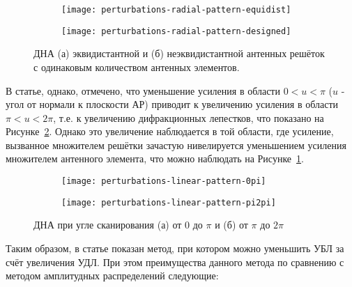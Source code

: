 \begin{figure}[H]
    \centering
    \begin{subfigure}[b]{0.4\textwidth}
        \centering
        \texttt{[image: perturbations-radial-pattern-equidist]}
        \caption{}%
    \end{subfigure}
    \begin{subfigure}[b]{0.4\textwidth}
        \centering
        \texttt{[image: perturbations-radial-pattern-designed]}
        \caption{}%
    \end{subfigure}
    \caption{%
        ДНА
        (а) эквидистантной и
        (б) неэквидистантной антенных решёток
        с одинаковым количеством антенных элементов.
    }%
    \label{fig:perturbations-radial-pattern}
\end{figure}

\begin{sloppypar}
    В статье, однако, отмечено, что уменьшение усиления в области ${0<u<\pi}$ ($u$ - угол от нормали к плоскости АР) приводит к
    увеличению усиления в области ${\pi<u<2\pi}$, т.е. к увеличению дифракционных лепестков, что показано на
    Рисунке~\ref{fig:perturbations-linear-pattern}. Однако это увеличение наблюдается в той области, где усиление, вызванное
    множителем решётки зачастую нивелируется уменьшением усиления множителем
    антенного элемента, что можно наблюдать на {Рисунке~\ref{fig:perturbations-radial-pattern}}.
\end{sloppypar}


\begin{figure}[H]
    \centering
    \begin{subfigure}[b]{0.4\textwidth}
        \centering
        \texttt{[image: perturbations-linear-pattern-0pi]}
        \caption{}%
    \end{subfigure}
    \begin{subfigure}[b]{0.4\textwidth}
        \centering
        \texttt{[image: perturbations-linear-pattern-pi2pi]}
        \caption{}%
    \end{subfigure}
    \caption{%
        ДНА при угле сканирования
        (а) от $0$ до $\pi$ и
        (б) от $\pi$ до $2\pi$
    }%
    \label{fig:perturbations-linear-pattern}
\end{figure}

Таким образом, в статье показан метод, при котором можно уменьшить УБЛ за счёт увеличения УДЛ.
При этом преимущества данного метода по сравнению с методом амплитудных распределений следующие:

